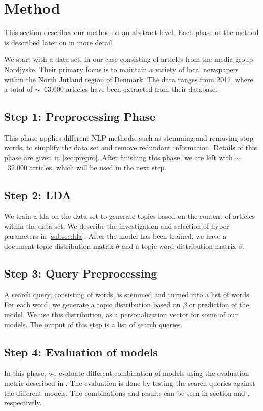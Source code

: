 \section{Method}\label{sec:method}
This section describes our method on an abstract level.
Each phase of the method is described later on in more detail. 

We start with a data set, in our case consisting of articles from the media group Nordjyske. 
Their primary focus is to maintain a variety of local newspapers within the North Jutland region of Denmark. 
The data ranges from 2017, where a total of $\sim$~63.000 articles have been extracted from their database.

\subsection*{Step 1: Preprocessing Phase}
This phase applies different \gls{NLP} methods, such as stemming and removing stop words, to simplify the data set and remove redundant information.
Details of this phase are given in \autoref{sec:prepro}.
After finishing this phase, we are left with $\sim$~32.000 articles, which will be used in the next step.

\subsection*{Step 2: LDA}
We train a \acrfull{lda} on the data set to generate topics based on the content of articles within the data set. 
We describe the investigation and selection of hyper parameters in \autoref{subsec:lda}. 
After the model has been trained, we have a document-topic distribution matrix $\theta$ and a topic-word distribution matrix $\beta$.

\subsection*{Step 3: Query Preprocessing}
A search query, consisting of words, is stemmed and turned into a list of words.
For each word, we generate a topic distribution based on $\beta$ or prediction of the model.
We use this distribution, as a personalization vector for some of our models.
The output of this step is a list of search queries.


\subsection*{Step 4: Evaluation of models}
In this phase, we evaluate different combination of models using the evaluation metric described in .
The evaluation is done by testing the search queries against the different models. 
The combinations and results can be seen in section  and , respectively.



